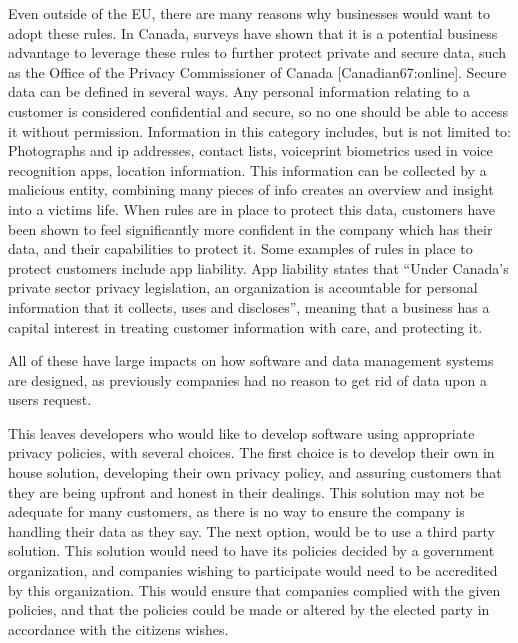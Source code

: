 \documentclass[11pt,journal]{IEEEtran}
\begin{document}
Even outside of the EU, there are many reasons why businesses would want to adopt these rules. In Canada, surveys have shown that it is a potential business advantage to leverage these rules to further protect private and secure data, such as the Office of the Privacy Commissioner of Canada [Canadian67:online]. Secure data can be defined in several ways. Any personal information relating to a customer is considered confidential and secure, so no one should be able to access it without permission. Information in this category includes, but is not limited to: Photographs and ip addresses, contact lists, voiceprint biometrics used in voice recognition apps, location information.  This information can be collected by a malicious entity, combining many pieces of info creates an overview and insight into a victims life. When rules are in place to protect this data, customers have been shown to feel significantly more confident in the company which has their data, and their capabilities to protect it. Some examples of rules in place to protect customers include app liability. App liability states that “Under Canada’s private sector privacy legislation, an organization is accountable for personal information that it collects, uses and discloses”, meaning that a business has a capital interest in treating customer information with care, and protecting it.

All of these have large impacts on how software and data management systems are designed, as previously companies had no reason to get rid of data upon a users request.

This leaves developers who would like to develop software using appropriate privacy policies, with several choices.  The first choice is to develop their own in house solution, developing their own privacy policy, and assuring customers that they are being upfront and honest in their dealings.  This solution may not be adequate for many customers, as there is no way to ensure the company is handling their data as they say.  The next option, would be to use a third party solution.  This solution would need to have its policies decided by a government organization, and companies wishing to participate would need to be accredited by this organization.  This would ensure that companies complied with the given policies, and that the policies could be made or altered by the elected party in accordance with the citizens wishes.
\end{document}
